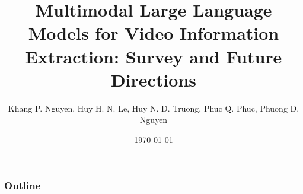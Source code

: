 \documentclass[aspectratio=169,10pt]{beamer}
\title[Fact-Checking Slides]{\large\textbf{Multimodal Large Language Models for Video Information Extraction: Survey and Future Directions}}
\author[Khang P. Nguyen, Huy H. N. Le, Huy N. D. Truong, Phuc Q. Phuc, Phuong D. Nguyen]{Khang P. Nguyen, Huy H. N. Le, Huy N. D. Truong, Phuc Q. Phuc, Phuong D. Nguyen \inst{1}}
\institute[]{
\inst{1}University of Science, VNU-HCM
}
\date{\today}
\begin{document}
\begin{frame}
    \titlepage
\end{frame}

\begin{frame}[t,allowframebreaks]
    \frametitle{Outline}
    \tableofcontents
\end{frame}





\end{document}
